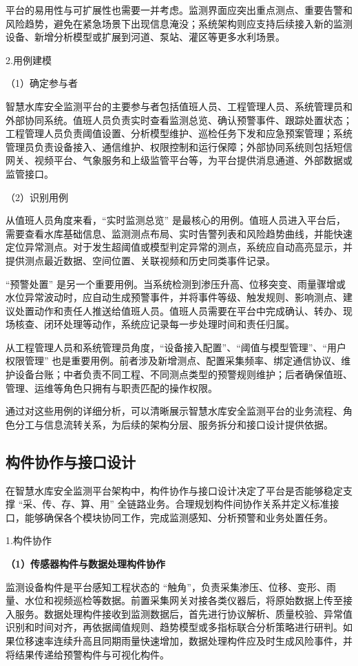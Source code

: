 平台的易用性与可扩展性也需要一并考虑。监测界面应突出重点测点、重要告警和风险趋势，避免在紧急场景下出现信息淹没；系统架构则应支持后续接入新的监测设备、新增分析模型或扩展到河道、泵站、灌区等更多水利场景。

2.用例建模

（1）确定参与者

智慧水库安全监测平台的主要参与者包括值班人员、工程管理人员、系统管理员和外部协同系统。值班人员负责实时查看监测总览、确认预警事件、跟踪处置状态；工程管理人员负责阈值设置、分析模型维护、巡检任务下发和应急预案管理；系统管理员负责设备接入、通信维护、权限控制和运行保障；外部协同系统则包括短信网关、视频平台、气象服务和上级监管平台等，为平台提供消息通道、外部数据或监管接口。

（2）识别用例

从值班人员角度来看，“实时监测总览” 是最核心的用例。值班人员进入平台后，需要查看水库基础信息、监测测点布局、实时告警列表和风险趋势曲线，并能快速定位异常测点。对于发生超阈值或模型判定异常的测点，系统应自动高亮显示，并提供测点最近数据、空间位置、关联视频和历史同类事件记录。

“预警处置” 是另一个重要用例。当系统检测到渗压升高、位移突变、雨量骤增或水位异常波动时，应自动生成预警事件，并将事件等级、触发规则、影响测点、建议处置动作和责任人推送给值班人员。值班人员需要在平台中完成确认、转办、现场核查、闭环处理等动作，系统应记录每一步处理时间和责任归属。

从工程管理人员和系统管理员角度，“设备接入配置”、“阈值与模型管理”、“用户权限管理” 也是重要用例。前者涉及新增测点、配置采集频率、绑定通信协议、维护设备台账；中者负责不同工程、不同测点类型的预警规则维护；后者确保值班、管理、运维等角色只拥有与职责匹配的操作权限。

通过对这些用例的详细分析，可以清晰展示智慧水库安全监测平台的业务流程、角色分工与信息流转关系，为后续的架构分层、服务拆分和接口设计提供依据。

\subsection{构件协作与接口设计}

在智慧水库安全监测平台架构中，构件协作与接口设计决定了平台是否能够稳定支撑 “采、传、存、算、用” 全链路业务。合理规划构件间协作关系并定义标准接口，能够确保各个模块协同工作，完成监测感知、分析预警和业务处置任务。

1.构件协作

\textbf{（1）传感器构件与数据处理构件协作}

监测设备构件是平台感知工程状态的 “触角”，负责采集渗压、位移、变形、雨量、水位和视频巡检等数据。前置采集网关对接各类仪器后，将原始数据上传至接入服务。数据处理构件接收到监测数据后，首先进行协议解析、质量校验、异常值识别和时间对齐，再依据阈值规则、趋势模型或多指标联合分析策略进行研判。如果位移速率连续升高且同期雨量快速增加，数据处理构件应及时生成风险事件，并将结果传递给预警构件与可视化构件。


